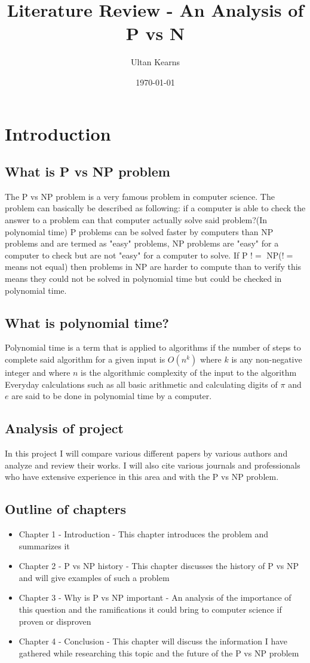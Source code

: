\documentclass{report}
\title{Literature Review - An Analysis of P vs N}
\author{Ultan Kearns}
\date{\today}
\begin{document}
\maketitle
\tableofcontents
\chapter{Introduction}
\section{What is P vs NP problem}
The P vs NP problem is a very famous problem in computer science.  The problem
can basically be described as following: if a computer is able to check the answer
to a problem can that computer actually solve said problem?(In polynomial time)\cite{wiki}  P problems can be
solved faster by computers than NP problems and are termed as "easy" problems, NP problems
are "easy" for a computer to check but are not "easy" for a computer to solve.\cite{wiki}
If P $!=$ NP($!=$ means not equal) then problems in NP are harder to compute than to verify
this means they could not be solved in polynomial time but could be checked in polynomial time.
\section{What is polynomial time?}
Polynomial time is a term that is applied to algorithms if the number of steps
to complete said algorithm for a given input is $O(n^k)$ where $k$ is any non-negative
integer and where $n$ is the algorithmic complexity of the input to the algorithm \cite{polynomial}
Everyday calculations such as all basic arithmetic and calculating digits of $\pi$ and $e$ are said
to be done in polynomial time by a computer\cite{polynomial}.
\section{Analysis of project}
In this project I will compare various different papers by various authors and
analyze and review their works.  I will also cite various journals and professionals
who have extensive experience in this area and with the P vs NP problem.
\section{Outline of chapters}
\begin{itemize}
  \item Chapter 1 - Introduction - This chapter introduces the problem and summarizes it
  \item  Chapter 2 - P vs NP history - This chapter discusses the history of P vs NP and will give examples of such a problem
  \item Chapter 3 - Why is P vs NP important - An analysis of the importance of this question and the ramifications it could bring to computer science if proven or disproven
  \item Chapter 4 - Conclusion - This chapter will discuss the information I have gathered while researching this topic and the future of the P vs NP problem
\end{itemize}
\end{document}
